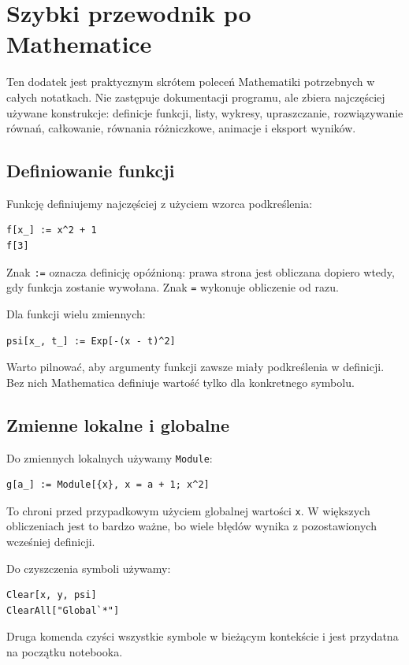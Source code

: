 \chapter{Szybki przewodnik po Mathematice}

\begin{summarybox}
Ten dodatek jest praktycznym skrótem poleceń Mathematiki potrzebnych w całych
notatkach. Nie zastępuje dokumentacji programu, ale zbiera najczęściej używane
konstrukcje: definicje funkcji, listy, wykresy, upraszczanie, rozwiązywanie
równań, całkowanie, równania różniczkowe, animacje i eksport wyników.
\end{summarybox}

\section{Definiowanie funkcji}

Funkcję definiujemy najczęściej z użyciem wzorca podkreślenia:
\begin{verbatim}
f[x_] := x^2 + 1
f[3]
\end{verbatim}
Znak \texttt{:=} oznacza definicję opóźnioną: prawa strona jest obliczana dopiero wtedy, gdy funkcja zostanie wywołana. Znak \texttt{=} wykonuje obliczenie od razu.

Dla funkcji wielu zmiennych:
\begin{verbatim}
psi[x_, t_] := Exp[-(x - t)^2]
\end{verbatim}
Warto pilnować, aby argumenty funkcji zawsze miały podkreślenia w definicji. Bez nich Mathematica definiuje wartość tylko dla konkretnego symbolu.

\section{Zmienne lokalne i globalne}

Do zmiennych lokalnych używamy \texttt{Module}:
\begin{verbatim}
g[a_] := Module[{x}, x = a + 1; x^2]
\end{verbatim}
To chroni przed przypadkowym użyciem globalnej wartości \texttt{x}. W większych obliczeniach jest to bardzo ważne, bo wiele błędów wynika z pozostawionych wcześniej definicji.

Do czyszczenia symboli używamy:
\begin{verbatim}
Clear[x, y, psi]
ClearAll["Global`*"]
\end{verbatim}
Druga komenda czyści wszystkie symbole w bieżącym kontekście i jest przydatna na początku notebooka.

